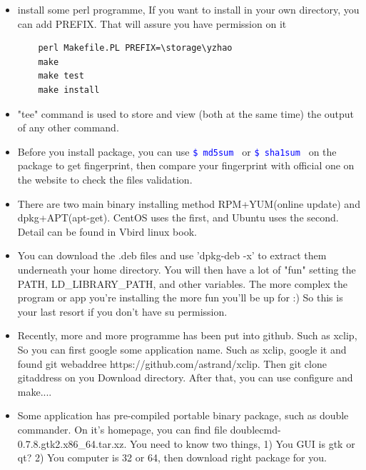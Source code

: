 \documentclass[a4paper,12pt,twoside]{book}
\newcommand{\linuxcommand}[1]{\texttt{\textcolor{blue}{\$ #1 \Pisymbol{psy}{191}}}}
\begin{document}
\begin{itemize}
	 \item install some perl programme, If you want to install in your own directory, you can add PREFIX. That will assure you have permission on it
    \begin{verbatim}
    perl Makefile.PL PREFIX=\storage\yzhao
    make
    make test
    make install
    \end{verbatim}
		\item "tee" command is used to store and view (both at the same time) the output of any other command. 

		\item Before you install package, you can use \linuxcommand{md5sum} or \linuxcommand{sha1sum} on the package to get fingerprint, then compare your fingerprint with official one on the website to check the files validation.  
				
		\item There are two main binary installing method RPM+YUM(online update) and dpkg+APT(apt-get). CentOS uses the first, and Ubuntu uses the second. Detail can be found in Vbird linux book.

		\item  You can download the .deb files and use 'dpkg-deb -x' to extract them underneath your home directory. You will then have a lot of "fun" setting the PATH, LD\_LIBRARY\_PATH, and other variables. The more complex the program or app you're installing the more fun you'll be up for :) So this is your last resort if you don't have su permission.

		\item Recently, more and more programme has been put into github. Such as xclip, So you can first google some application name. Such as xclip, google it and found git webaddree https://github.com/astrand/xclip. Then git clone gitaddress on you Download directory. After that, you can use configure and make....

		\item Some application has pre-compiled portable binary package, such as double commander. On it's homepage, you can find file  doublecmd-0.7.8.gtk2.x86\_64.tar.xz. You need to know two things, 1) You GUI is gtk or qt? 2) You computer is 32 or 64, then download right package for you.
	\end{itemize}
\end{document}
